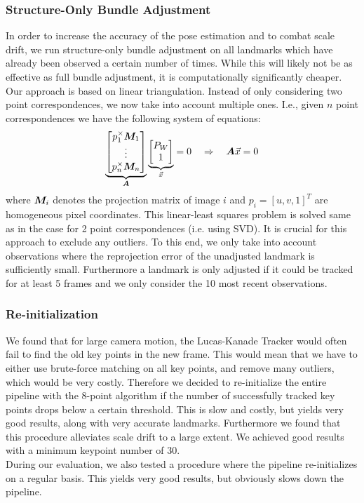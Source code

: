 \documentclass[11pt]{article}
\newcommand{\mat}{\matrixsym}
\begin{document}
\subsubsection{Structure-Only Bundle Adjustment}
In order to increase the accuracy of the pose estimation and to combat scale drift, we run structure-only bundle adjustment on all landmarks which have already been observed a certain number of times. While this will likely not be as effective as full bundle adjustment, it is computationally significantly cheaper.\\
Our approach is based on linear triangulation. Instead of only considering two point correspondences, we now take into account multiple ones. I.e., given $n$ point correspondences we have the following system of equations:
\begin{equation*}
\underbrace{\begin{bmatrix} p_1^\times \mat{M}_1\\ \vdots \\ p_n^\times \mat{M}_n \end{bmatrix}}_{\mat{A}} \underbrace{\begin{bmatrix} P_W \\ 1 \end{bmatrix}}_{\vec{x}} = 0 \quad \Rightarrow \quad \mat{A} \vec{x} = 0
\end{equation*}
where $\mat{M}_i$ denotes the projection matrix of image $i$ and $p_i = [u,v,1]^T$ are homogeneous pixel coordinates. This linear-least squares problem is solved same as in the case for 2 point correspondences (i.e. using SVD). It is crucial for this approach to exclude any outliers. To this end, we only take into account observations where the reprojection error of the unadjusted landmark is sufficiently small. Furthermore a landmark is only adjusted if it could be tracked for at least 5 frames and we only consider the 10 most recent observations.

\subsubsection{Re-initialization}
We found that for large camera motion, the Lucas-Kanade Tracker would often fail to find the old key points in the new frame. This would mean that we have to either use brute-force matching on all key points, and remove many outliers, which would be very costly. Therefore we decided to re-initialize the entire pipeline with the 8-point algorithm if the number of successfully tracked key points drops below a certain threshold. This is slow and costly, but yields very good results, along with very accurate landmarks. Furthermore we found that this procedure alleviates scale drift to a large extent. We achieved good results with a minimum keypoint number of 30.\\
During our evaluation, we also tested a procedure where the pipeline re-initializes on a regular basis. This yields very good results, but obviously slows down the pipeline.
\end{document}
